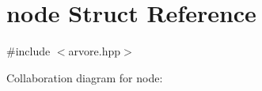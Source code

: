 \hypertarget{structnode}{}\section{node Struct Reference}
\label{structnode}


{\ttfamily \#include $<$arvore.\+hpp$>$}



Collaboration diagram for node\+:

